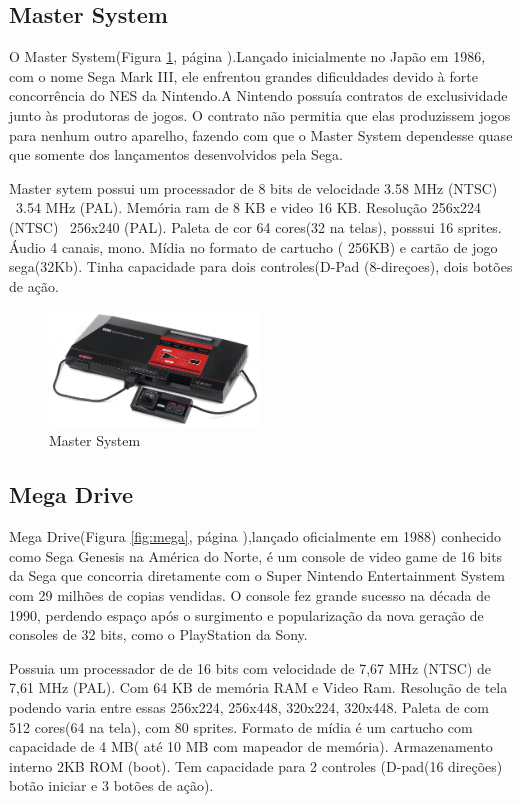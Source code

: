\documentclass[12pt]{article}
\begin{document}
\subsection{Master System}
 O Master System(Figura \ref{fig:system}, página \pageref{fig:system}).Lançado inicialmente no Japão em 1986, com o nome Sega Mark III, ele enfrentou grandes dificuldades devido à forte concorrência do NES da Nintendo.A Nintendo possuía contratos de exclusividade junto às produtoras de jogos. O contrato não permitia que elas produzissem jogos para nenhum outro aparelho, fazendo com que o Master System dependesse quase que somente dos lançamentos desenvolvidos pela Sega.
 
 Master sytem possui um processador de 8 bits de velocidade 3.58 MHz (NTSC) \ 3.54 MHz (PAL). Memória ram de 8 KB e video 16 KB. Resolução 256x224 (NTSC) \ 256x240 (PAL). Paleta de cor 64 cores(32 na telas), posssui 16 sprites. Áudio 4 canais, mono. Mídia no formato de cartucho ( 256KB) e cartão de jogo sega(32Kb). Tinha capacidade para dois controles(D-Pad (8-direçoes), dois botões de ação.
 
 \begin{figure}[!htb]
    \centering
    \includegraphics[width=0.5\textwidth]{masters.jpg}
    \caption{Master System}
    \label{fig:system}
\end{figure} 

\subsection{Mega Drive}
Mega Drive(Figura \ref{fig:mega}, página \pageref{fig:mega}),lançado oficialmente em 1988) conhecido como Sega Genesis na América do Norte, é um console de video game de 16 bits da Sega que concorria diretamente com o Super Nintendo Entertainment System com 29 milhões de copias vendidas. O console fez grande sucesso na década de 1990, perdendo espaço após o surgimento e popularização da nova geração de consoles de 32 bits, como o PlayStation da Sony.

Possuia um processador de de 16 bits com velocidade de 7,67 MHz (NTSC) 
de 7,61 MHz (PAL). Com 64 KB de memória RAM e Video Ram. Resolução de tela podendo varia entre essas 256x224, 256x448, 320x224, 320x448. Paleta de com 512 cores(64 na tela), com 80 sprites. Formato de mídia é um cartucho com capacidade de 4 MB( até 10 MB com mapeador de memória). Armazenamento interno 2KB ROM (boot). Tem capacidade para 2 controles (D-pad(16 direções) botão iniciar e 3 botões de ação).
\end{document}
